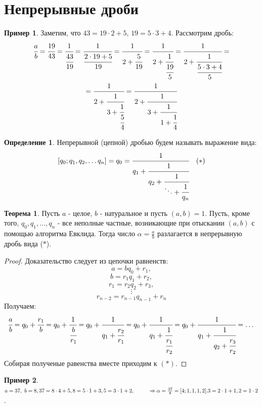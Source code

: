 \documentclass[a4paper, 12pt]{article}
\newcommand\tab[1][.5cm]{\hspace*{#1}}
\theoremstyle{definition}
\newtheorem{definition}{Определение}[section]
\newtheorem{theorem}{Теорема}[section]
\newtheorem*{example}{Пример}
\begin{document}
    \section{Непрерывные дроби}
    \begin{example}
        Заметим, что  $43=19\cdot 2+5$, $19=5\cdot 3+4$. Рассмотрим дробь:
        \begin{multline*}
            \cfrac{a}{b}=\cfrac{19}{43}=\cfrac{1}{\cfrac{43}{19}}=\cfrac{1}{\cfrac{2\cdot 19+5}{19}}=\cfrac{1}{2+\cfrac{5}{19}}=\cfrac{1}{2+\cfrac{1}{\cfrac{19}{5}}}=\cfrac{1}{2+\cfrac{1}{\cfrac{5\cdot 3+4}{5}}}=\\
            =\cfrac{1}{2+\cfrac{1}{3+\cfrac{1}{\cfrac{5}{4}}}}=\cfrac{1}{2+\cfrac{1}{3+\cfrac{1}{1+\cfrac{1}{4}}}}
        \end{multline*}
    \end{example}
    \begin{definition}
        Непрерывной (цепной) дробью будем называть выражение вида:
        \[[q_0; q_1, q_2, \dots q_n] = q_0=\cfrac{1}{q_1+\cfrac{1}{q_2+\cfrac{1}{\ddots+\cfrac{1}{q_n}}}}\ \ \ (\ast)\]
    \end{definition}
    \begin{theorem} \label{th7.1}
        Пусть $a$ - целое, $b$ - натуральное и пусть $(a,b)=1$. Пусть, кроме того, $q_0, q_1,\dots, q_n$ - все неполные частные, возникающие при отыскании $(a,b)$ с помощью алгоритма Евклида. Тогда число $\alpha=\frac{a}{b}$ разлагается в непрерывную дробь вида ($\ast$).
    \end{theorem} 
    \begin{proof}
        Доказательство следует из цепочки равненств:\\
        \[a=bq_0+r_1,\]
        \[b=r_1q_1+r_2,\]
        \[r_1=r_2q_2+r_3,\]
        \[\vdots\]
        \[r_{n-2}=r_{n-1}q_{n-1}+r_n\]
        Получаем:
        \begin{equation*}
            \cfrac{a}{b}=q_0+\cfrac{r_1}{b}=q_0+\cfrac{1}{\cfrac{b}{r_1}}=q_0+\cfrac{1}{q_1+\cfrac{r_2}{r_1}}=q_0+\cfrac{1}{q_1+\cfrac{1}{\cfrac{r_1}{r_2}}}=q_0+\cfrac{1}{q_1+\cfrac{1}{q_2+\cfrac{r_3}{r_2}}}=\dots
        \end{equation*}
        Собирая полученые равенства вместе приходим к $(\ast)$.
    \end{proof}
    \begin{example}\tab \\
        $a=37,\ b=8,\\
        37=8\cdot 4+5,\\
        8=5\cdot 1+3,\\
        5=3\cdot 1+2, \tab[1cm] \Rightarrow \alpha=\frac{37}{8}=[4;1,1,1,2].\\
        3=2\cdot 1+1,\\
        2=1\cdot 2$.
    \end{example}
\end{document}
